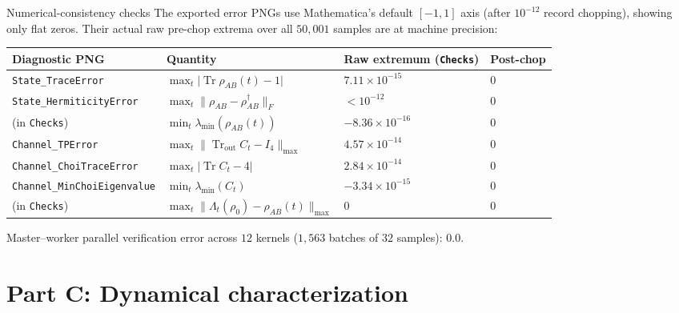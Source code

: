 \documentclass[aspectratio=169,11pt]{beamer}
\newcommand{\Tr}{\operatorname{Tr}}
\newcommand{\mutednote}[1]{{\color{muted}\scriptsize #1}}
\begin{document}
\begin{frame}{Numerical-consistency checks}
\footnotesize
The exported error PNGs use Mathematica's default $[-1,1]$ axis (after $10^{-12}$ record chopping), showing only flat zeros. Their actual raw pre-chop extrema over all $50{,}001$ samples are at machine precision:
\smallskip
\begin{center}
\begin{tabular}{@{}llll@{}}
\toprule
Diagnostic PNG & Quantity & Raw extremum (\texttt{Checks}) & Post-chop \\\midrule
\texttt{State\_TraceError} & $\max_t\lvert\Tr\rho_{AB}(t)-1\rvert$ & $7.11\times 10^{-15}$ & $0$ \\
\texttt{State\_HermiticityError} & $\max_t\lVert\rho_{AB}-\rho_{AB}^\dagger\rVert_F$ & $<10^{-12}$ & $0$ \\
(in \texttt{Checks}) & $\min_t\lambda_{\min}(\rho_{AB}(t))$ & $-8.36\times 10^{-16}$ & $0$ \\
\texttt{Channel\_TPError} & $\max_t\lVert\Tr_{\mathrm{out}}C_t-I_4\rVert_{\max}$ & $4.57\times 10^{-14}$ & $0$ \\
\texttt{Channel\_ChoiTraceError} & $\max_t\lvert\Tr C_t-4\rvert$ & $2.84\times 10^{-14}$ & $0$ \\
\texttt{Channel\_MinChoiEigenvalue} & $\min_t\lambda_{\min}(C_t)$ & $-3.34\times 10^{-15}$ & $0$ \\
(in \texttt{Checks}) & $\max_t\lVert\Lambda_t(\rho_0)-\rho_{AB}(t)\rVert_{\max}$ & $0$ & $0$ \\\bottomrule
\end{tabular}
\end{center}
\smallskip
\mutednote{Master--worker parallel verification error across $12$ kernels ($1{,}563$ batches of $32$ samples): $0.0$.}
\end{frame}

\section{Part C: Dynamical characterization}
\end{document}
